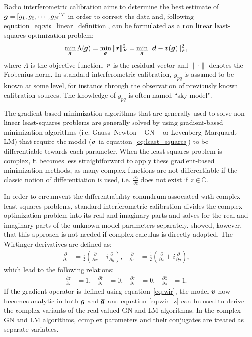 \documentclass[useAMS,usenatbib]{mn2e}
\newcommand{\br}{\bmath{r}}
\newcommand{\bg}{\bmath{g}}
\newcommand{\bd}{\bmath{d}}
\newcommand{\bv}{\bmath{v}}
\newcommand{\conj}[1]{\overline{#1}}
\begin{document}
Radio interferometric calibration aims to determine the best estimate of $\bg = [g_1,g_2,\cdots,g_N]^T$ in order to correct the data and, following equation~\ref{eq:vis_linear_definition}, can be formulated as a non linear least-squares optimization problem:
\begin{equation}
\label{eq:least_squares}
\min_{\bg} \Lambda(\bg) = \min_{\bg} \|\br\|_F^2 = \min_{\bg} \|\bd - \bv(\bg)\|_F^2, 
\end{equation}
where $\Lambda$ is the objective function, $\br$ is the residual vector and $\|\cdot\|$ denotes the Frobenius norm. In standard interferometric calibration, $y_{pq}$ is assumed to be known at some level, for instance through the observation of previously known calibration sources. The knowledge of $y_{pq}$ is often named ``sky model".

The gradient-based minimization algorithms that are generally used to solve non-linear least-squares problems are generally solved by using gradient-based minimization algorithms (i.e. Gauss--Newton -- GN -- or Levenberg--Marquardt -- LM) that require the model ($\bv$ in equation~\ref{eq:least_squares}) to be differentiable towards each parameter. 
When the least squares problem is complex, it becomes less straightforward to apply these gradient-based minimization methods, as
many complex functions are not differentiable if the classic notion of differentiation is used, i.e. $\frac{\partial \conj{z}}{\partial z}$ does not exist if $z \in \mathbb{C}$.

In order to circumvent the differentiability conundrum associated with complex least squares problems, standard interferometric calibration divides the complex optimization problem into its real and imaginary parts and solves for the real and imaginary parts of the unknown model parameters separately. \citet{Smirnov2015} showed, however, that this approach is not needed if complex calculus \citep{Wirtinger1927} is directly adopted. The Wirtinger derivatives are defined as:
\begin{align}
\label{eq:wir}
\frac{\partial}{\partial z} &= \frac{1}{2}\left ( \frac{\partial}{\partial x} -  i \frac{\partial}{\partial y} \right ),&\frac{\partial}{\partial \conj{z}} &= \frac{1}{2}\left ( \frac{\partial}{\partial x} +  i \frac{\partial}{\partial y} \right ), 
\end{align}
which lead to the following relations:
\begin{align}
\label{eq:wir_z}
\frac{\partial z}{\partial z} & = 1, & \frac{\partial \conj{z}}{\partial z}&=0, & \frac{\partial z}{\partial \conj{z}} & = 0, & \frac{\partial \conj{z}}{\partial \conj{z}}&=1.
\end{align}
If the gradient operator is defined using equation~\ref{eq:wir}, the model $\bv$ now becomes analytic in both $\bg$ and $\conj{\bg}$ and equation \ref{eq:wir_z} can be used to derive the complex variants of the real-valued GN and LM algorithms. In the complex GN and LM algorithms, complex parameters and their conjugates are treated as separate variables.
\end{document}
